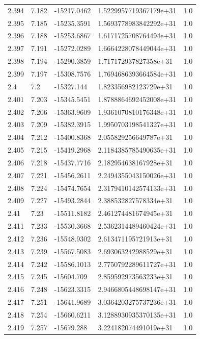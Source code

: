 \begin{tabular}{lllll}
2.394 & 7.182 & -15217.0462 & 1.5229957719367179e+31 & 1.0 \\
2.395 & 7.185 & -15235.3591 & 1.5693778983842292e+31 & 1.0 \\
2.396 & 7.188 & -15253.6867 & 1.6171725708764494e+31 & 1.0 \\
2.397 & 7.191 & -15272.0289 & 1.6664228078449044e+31 & 1.0 \\
2.398 & 7.194 & -15290.3859 & 1.717172937827358e+31 & 1.0 \\
2.399 & 7.197 & -15308.7576 & 1.7694686393664584e+31 & 1.0 \\
2.4 & 7.2 & -15327.144 & 1.823356982123729e+31 & 1.0 \\
2.401 & 7.203 & -15345.5451 & 1.8788864692452008e+31 & 1.0 \\
2.402 & 7.206 & -15363.9609 & 1.9361070810176348e+31 & 1.0 \\
2.403 & 7.209 & -15382.3915 & 1.9950703198541327e+31 & 1.0 \\
2.404 & 7.212 & -15400.8368 & 2.055829256649787e+31 & 1.0 \\
2.405 & 7.215 & -15419.2968 & 2.1184385785490635e+31 & 1.0 \\
2.406 & 7.218 & -15437.7716 & 2.182954638167928e+31 & 1.0 \\
2.407 & 7.221 & -15456.2611 & 2.2494355043150026e+31 & 1.0 \\
2.408 & 7.224 & -15474.7654 & 2.3179410142574133e+31 & 1.0 \\
2.409 & 7.227 & -15493.2844 & 2.388532827578334e+31 & 1.0 \\
2.41 & 7.23 & -15511.8182 & 2.461274481674945e+31 & 1.0 \\
2.411 & 7.233 & -15530.3668 & 2.5362314489460424e+31 & 1.0 \\
2.412 & 7.236 & -15548.9302 & 2.613471195721913e+31 & 1.0 \\
2.413 & 7.239 & -15567.5083 & 2.693063242988529e+31 & 1.0 \\
2.414 & 7.242 & -15586.1013 & 2.7750792289611727e+31 & 1.0 \\
2.415 & 7.245 & -15604.709 & 2.859592973563233e+31 & 1.0 \\
2.416 & 7.248 & -15623.3315 & 2.9466805448698147e+31 & 1.0 \\
2.417 & 7.251 & -15641.9689 & 3.0364203275737236e+31 & 1.0 \\
2.418 & 7.254 & -15660.6211 & 3.1288930935370135e+31 & 1.0 \\
2.419 & 7.257 & -15679.288 & 3.224182074491019e+31 & 1.0 \\

\end{tabular}
